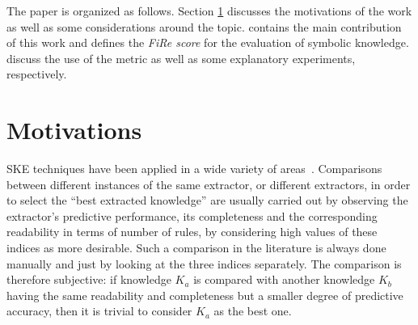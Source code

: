 \documentclass{article}
\newcommand{\fire}{FiRe}
\begin{document}
The paper is organized as follows.
Section \ref{sec:motivation} discusses the motivations of the work as well as some considerations around the topic.
%
 contains the main contribution of this work and defines the \emph{\fire{} score} for the evaluation of symbolic knowledge.
 discuss the use of the metric as well as some explanatory experiments, respectively.

\section{Motivations}\label{sec:motivation}

SKE techniques have been applied in a wide variety of areas~\cite[to cite some examples]{bologna1997three,hayashi2000comparison,baesens2003using,hofmann2003rule,steiner2006using,franco2007early,sabbatini22LPFSKE}.
%
Comparisons between different instances of the same extractor, or different extractors, in order to select the ``best extracted knowledge'' are usually carried out by observing the extractor's predictive performance, its completeness and the corresponding readability in terms of number of rules, by considering high values of these indices as more desirable.
%
Such a comparison in the literature is always done manually and just by looking at the three indices separately.
%
The comparison is therefore subjective: if knowledge $K_a$ is compared with another knowledge $K_b$ having the same readability and completeness but a smaller degree of predictive accuracy, then it is trivial to consider $K_a$ as the best one.
\end{document}
